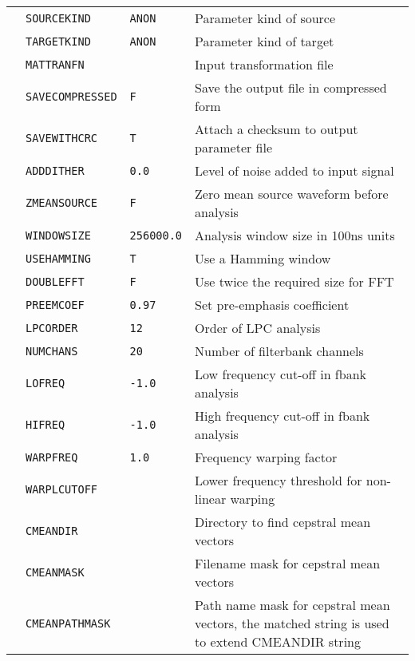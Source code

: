 \begin{center}
\begin{supertabular}{|p{1.8cm}|l|l|p{6.6cm}|}
  & \texttt{SOURCEKIND} & \texttt{ANON} & Parameter kind of source \\ 
  & \texttt{TARGETKIND} & \texttt{ANON} & Parameter kind of target \\ 
  & \texttt{MATTRANFN } &  & Input transformation file  \\ 
  & \texttt{SAVECOMPRESSED} & \texttt{F} & Save the output file in compressed form \\ 
  & \texttt{SAVEWITHCRC} & \texttt{T} & Attach a checksum to output parameter file \\ 
  & \texttt{ADDDITHER} & \texttt{0.0} & Level of noise added to input signal \\  
  & \texttt{ZMEANSOURCE} & \texttt{F} & Zero mean source waveform before analysis \\ 
  & \texttt{WINDOWSIZE} & \texttt{256000.0} & Analysis window size in 100ns units \\ 
  & \texttt{USEHAMMING} & \texttt{T} & Use a Hamming window \\ 
  & \texttt{DOUBLEFFT} & \texttt{F} & Use twice the required size for FFT \\ 
  & \texttt{PREEMCOEF} & \texttt{0.97} & Set pre-emphasis coefficient \\ 
  & \texttt{LPCORDER} &  \texttt{12} &  Order of LPC analysis \\ 
  & \texttt{NUMCHANS} & \texttt{20} & Number of filterbank channels \\ 
  & \texttt{LOFREQ} & \texttt{-1.0} & Low frequency cut-off in fbank analysis \\ 
  & \texttt{HIFREQ}  & \texttt{-1.0} & High frequency cut-off in fbank analysis \\  
  & \texttt{WARPFREQ} & \texttt{1.0} & Frequency warping factor \\ 
  & \texttt{WARPLCUTOFF} &  & Lower frequency threshold for non-linear warping  \\ 
  & \texttt{CMEANDIR} &  & Directory to find cepstral mean vectors  \\ 
  & \texttt{CMEANMASK} &  & Filename mask for cepstral mean vectors  \\ 
  & \texttt{CMEANPATHMASK} &  & Path name mask for cepstral mean vectors, the matched string is used to extend CMEANDIR string \\ 

\end{supertabular}
\end{center}
